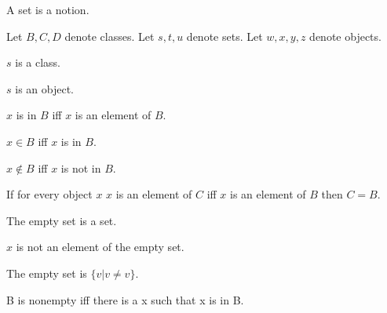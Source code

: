 \documentclass{article}
\begin{document}
  \begin{forthel}

    \begin{signature}
      A set is a notion.
    \end{signature}

    Let $B, C, D$ denote classes.
    Let $s, t, u$ denote sets.
    Let $w, x, y, z$ denote objects.

    \begin{axiom}
      $s$ is a class.
    \end{axiom}
    
    \begin{axiom}
      $s$ is an object.
    \end{axiom}

    \begin{definition}
      $x$ is in $B$ iff $x$ is an element of $B$.
    \end{definition}

    \begin{definition}
      $x \in B$ iff $x$ is in $B$.
    \end{definition}

    \begin{definition}
      $x \notin B$ iff $x$ is not in $B$.
    \end{definition}

    \begin{axiom}[Ext]
      If for every object $x$ $x$ is an element of $C$ iff $x$ is an element of $B$ then $C = B$.
    \end{axiom}

    \begin{signature}
      The empty set is a set.
    \end{signature}

    \begin{axiom}[Empty]
      $x$ is not an element of the empty set.
    \end{axiom}

    \begin{lemma}
      The empty set is $\{ v | v \neq v \}$.
    \end{lemma}

    \begin{definition}
      B is nonempty iff there is a x such that x is in B.
    \end{definition}


\end{forthel}
\end{document}
